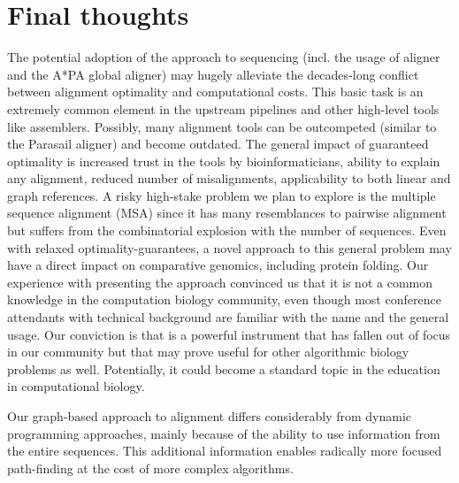 \section*{Final thoughts}

The potential adoption of the \A approach to sequencing (incl. the usage of
\astarix aligner and the A*PA global aligner) may hugely alleviate the
decades-long conflict between alignment optimality and computational costs. This
basic task is an extremely common element in the upstream pipelines and other
high-level tools like assemblers. Possibly, many alignment tools can be
outcompeted (similar to the Parasail aligner) and become outdated. The general
impact of guaranteed optimality is increased trust in the tools by
bioinformaticians, ability to explain any alignment, reduced number of
misalignments, applicability to both linear and graph references. A risky
high-stake problem we plan to explore is the multiple sequence alignment (MSA)
since it has many resemblances to pairwise alignment but suffers from the
combinatorial explosion with the number of sequences. Even with relaxed
optimality-guarantees, a novel approach to this general problem may have a
direct impact on comparative genomics, including protein folding. Our experience
with presenting the \A approach convinced us that it is not a common knowledge
in the computation biology community, even though most conference attendants
with technical background are familiar with the name and the general usage. Our
conviction is that \A is a powerful instrument that has fallen out of focus in
our community but that may prove useful for other algorithmic biology problems
as well. Potentially, it could become a standard topic in the education in
computational biology.

Our graph-based approach to alignment differs considerably from dynamic
programming approaches, mainly because of the ability to use information from the
entire sequences. This additional information enables radically more focused
path-finding at the cost of more complex algorithms.